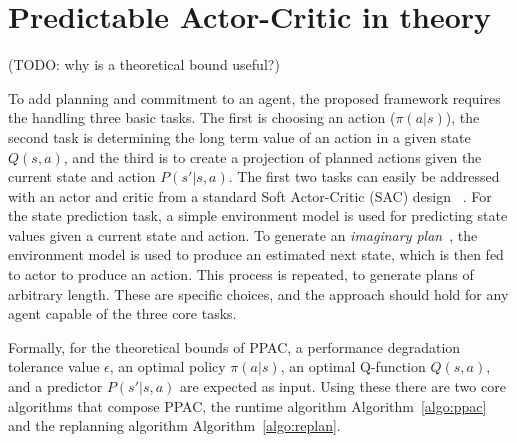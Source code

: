 \documentclass{article}
\begin{document}

    \section{Predictable Actor-Critic in theory} \label{section:PAC}

        
        (TODO: why is a theoretical bound useful?)
        
        To add planning and commitment to an agent, the proposed framework requires the handling three basic tasks. The first is choosing an action (\(\pi(a | s)\)), the second task is determining the long term value of an action in a given state \(Q(s,a)\), and the third is to create a projection of planned actions given the current state and action \(P(s' | s,a)\). The first two tasks can easily be addressed with an actor and critic from a standard Soft Actor-Critic (SAC) design ~\cite{haarnoja2018soft}. For the state prediction task, a simple environment model is used for predicting state values given a current state and action. To generate an \textit{imaginary plan}~\cite{racaniere2017imagination}, the environment model is used to produce an estimated next state, which is then fed to actor to produce an action. This process is repeated, to generate plans of arbitrary length. These are specific choices, and the approach should hold for any agent capable of the three core tasks.

        Formally, for the theoretical bounds of PPAC, a performance degradation tolerance value $\epsilon$, an optimal policy \(\pi(a | s)\), an optimal Q-function \(Q(s,a)\), and a predictor \(P(s'|s,a)\) are expected as input. Using these there are two core algorithms that compose PPAC, the runtime algorithm Algorithm~\ref{algo:ppac} and the replanning algorithm Algorithm~\ref{algo:replan}.
        
\end{document}
